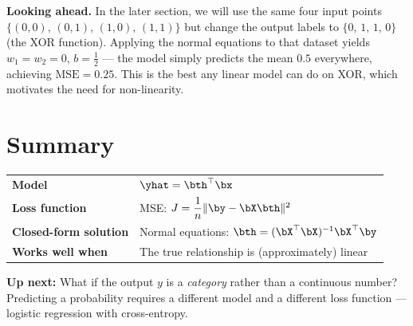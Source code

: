 \documentclass[12pt, a4paper]{article}
\begin{document}
\begin{notebox}
  \textbf{Looking ahead.}
  In the later section, we will use the same four input points
  $\{(0,0),\,(0,1),\,(1,0),\,(1,1)\}$ but change the output labels to
  $\{0,\,1,\,1,\,0\}$ (the XOR function). Applying the normal equations to
  that dataset yields $w_1 = w_2 = 0$, $b = \tfrac{1}{2}$ — the model simply
  predicts the mean $0.5$ everywhere, achieving $\mathrm{MSE} = 0.25$.
  This is the best any linear model can do on XOR, which motivates the
  need for non-linearity.

\end{notebox}

\section{Summary}

\begin{center}
  \renewcommand{\arraystretch}{1.5}
  \begin{tabular}{ll}
    \toprule
    \textbf{Model}                & $\yhat = \bth^{\top}\bx$                                     \\
    \textbf{Loss function}        & MSE: $J = \dfrac{1}{n}\|\by - \bX\bth\|^2$                   \\
    \textbf{Closed-form solution} & Normal equations: $\bth = (\bX^{\top}\bX)^{-1}\bX^{\top}\by$ \\
    \textbf{Works well when}      & The true relationship is (approximately) linear              \\
    \bottomrule
  \end{tabular}
\end{center}

\bigskip
\textbf{Up next:} What if the output $y$ is a \emph{category}
rather than a continuous number? Predicting a probability requires a
different model and a different loss function — logistic regression with
cross-entropy.
\end{document}
